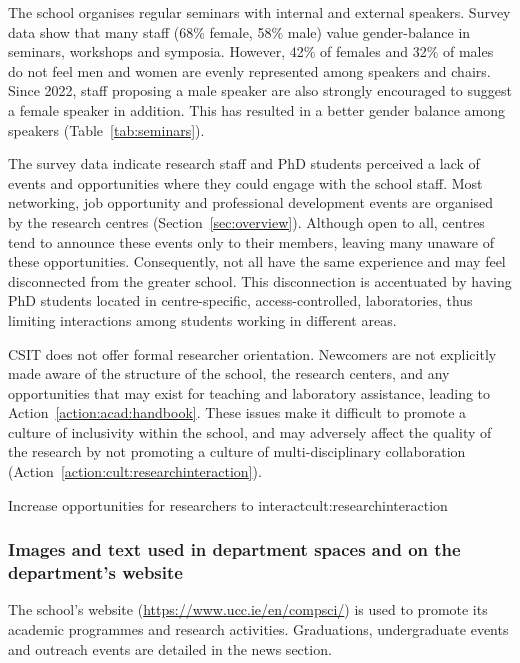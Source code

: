 The school organises regular seminars with internal and external speakers. Survey data show that many staff (68\% female, 58\% male) value gender-balance in seminars, workshops and symposia. However,  42\% of females and 32\% of males do not feel men and women are evenly represented among speakers and chairs. Since 2022, staff proposing a male speaker are also strongly encouraged to suggest a female speaker in addition. This has resulted in a better gender balance among speakers (Table~\ref{tab:seminars}).






The survey data indicate research staff and PhD students perceived a lack of events and opportunities where they could engage with the school staff. 
Most networking, job opportunity and professional development events are organised by the research centres (Section~\ref{sec:overview}). Although open to all, centres tend to announce these events only to their members, leaving many unaware of these opportunities. Consequently, not all have the same experience and may feel disconnected from the greater school.
This disconnection is accentuated by having PhD students located in centre-specific, access-controlled, laboratories, thus limiting interactions among students working in different areas. 

CSIT does not offer formal researcher orientation. Newcomers are not explicitly made aware of the structure of the school, the research centers, and any opportunities that may exist for teaching and laboratory assistance, leading to Action~\ref{action:acad:handbook}.
These issues make it difficult to promote a culture of inclusivity within the school, and may adversely affect the quality of the research by not promoting a culture of multi-disciplinary collaboration (Action~\ref{action:cult:researchinteraction}).


\begin{actionblock}{\ksspace{}Increase opportunities for researchers to interact}{cult:researchinteraction} 
\actimproveinteraction
\hfill{
    \hypersetup{hidelinks}
    \hyperlink{e2}{\gotoactionsymbol{}}
}
\end{actionblock}


\subsubsection{Images and text used in department spaces and on the department's website}
The school's website (\url{https://www.ucc.ie/en/compsci/}) is used to promote its academic programmes and research activities. Graduations, undergraduate events and outreach events are detailed in the news section.  

